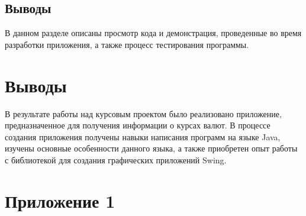 \documentclass[a4paper]{article}
\begin{document}
\subsection{Выводы}

В данном разделе описаны просмотр кода и демонстрация, проведенные во время разработки приложения, а также процесс тестирования программы. 

\section{Выводы}

В результате работы над курсовым проектом было реализовано приложение, предназначенное для получения информации о курсах валют. В процессе создания приложения получены навыки написания программ на языке Java, изучены основные особенности данного языка, а также приобретен опыт работы с библиотекой для создания графических приложений Swing.   

\section{Приложение 1}


\parindent=1cm


\parindent=1cm


\parindent=1cm


\parindent=1cm


\parindent=1cm


\parindent=1cm


\parindent=1cm


\parindent=1cm
\end{document}

